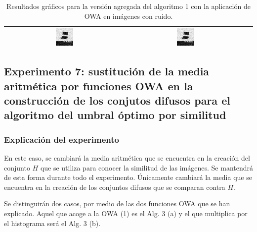 \begin{table}
\begin{tabular}{c|c|c}
\includegraphics[width=0.15\textwidth]{img/res/e6/alg1agregadoowa2chairsp020.jpg} &
\includegraphics[width=0.15\textwidth]{img/res/e6/alg1agregadoowa3chairsp020.jpg} \\\hline
\end{tabular}
\caption{Resultados gráficos para la versión agregada del algoritmo 1 con la aplicación de OWA en imágenes con ruido.\label{tab:resultexp6imagenesruido}}
\end{table}


\subsection{Experimento 7: sustitución de la media aritmética por funciones OWA en la construcción de los conjutos difusos para el algoritmo del umbral óptimo por similitud}
\subsubsection{Explicación del experimento}
En este caso, se cambiará la media aritmética que se encuentra en la creación del conjunto $H$ que se utiliza para conocer la similitud de las imágenes. Se mantendrá de esta forma durante todo el experimento. Únicamente cambiará la media que se encuentra en la creación de los conjuntos difusos que se comparan contra $H$.

Se distinguirán dos casos, por medio de las dos funciones OWA que se han explicado. Aquel que acoge a la OWA (1) es el Alg. 3 (a) y el que multiplica por el histograma será el Alg. 3 (b).

